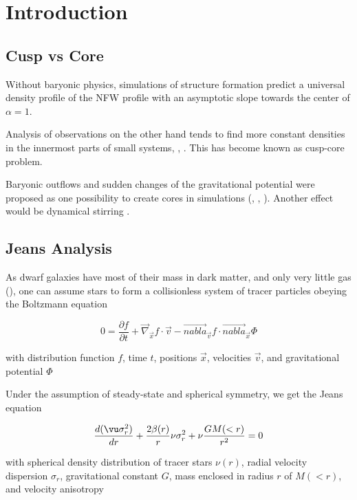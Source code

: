 
\section{Introduction}\label{sec:introduction}
\subsection{Cusp vs Core}
Without baryonic physics, simulations of structure formation predict a
universal density profile of the NFW profile \cite{Moore1999} with an
asymptotic slope towards the center of $\alpha=1$.

Analysis of observations on the other hand tends to find more constant
densities in the innermost parts of small systems,
\cite{FloresPrimack1994}, \cite{Oh+2011}. This has become known as
cusp-core problem.

Baryonic outflows and sudden changes of the gravitational potential
were proposed as one possibility to create cores in simulations
(\cite{Read+2006}, \cite{Pontzen+2013}, \cite{Teyssier}). Another
effect would be dynamical stirring \cite{Goerdt+2006}.


\subsection{Jeans Analysis}
As dwarf galaxies have most of their mass in dark matter, and only
very little gas (\citet{Gatto+2013}), one can assume stars to form a
collisionless system of tracer particles obeying the Boltzmann
equation

\begin{equation}
0=\frac{\partial f}{\partial t}+\vec{\nabla}_{\vec{x}} f\cdot\vec{v}-
\vec{nabla}_{\vec{v}}f\cdot\vec{nabla}_{\vec{x}}\Phi
\end{equation}

with distribution function $f$, time $t$, positions $\vec{x}$,
velocities $\vec{v}$, and gravitational potential $\Phi$

Under the assumption of steady-state and spherical symmetry, we get
the Jeans equation

\begin{equation}
\frac{d(\vu\sigma_r^2)}{dr}+
\frac{2\beta(r)}{r}\nu\sigma_r^2+
\nu\frac{GM(<r)}{r^2} = 0
\end{equation}

with spherical density distribution of tracer stars $\nu(r)$, radial
velocity dispersion $\sigma_r$, gravitational constant $G$, mass
enclosed in radius $r$ of $M(<r)$, and velocity anisotropy


